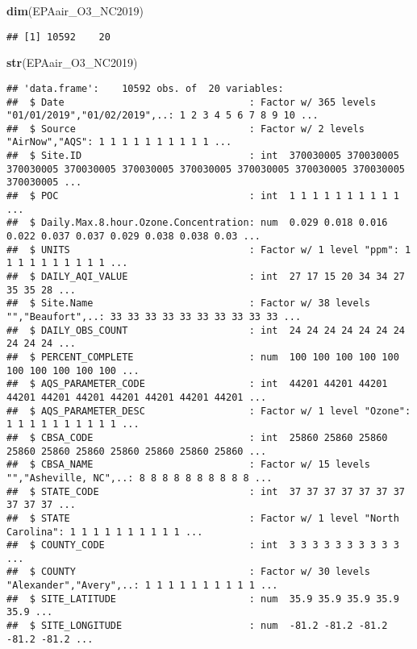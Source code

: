 \documentclass[]{article}
\newenvironment{Shaded}{\begin{snugshade}}{\end{snugshade}}
\newcommand{\KeywordTok}[1]{\textcolor[rgb]{0.13,0.29,0.53}{\textbf{#1}}}
\newcommand{\NormalTok}[1]{#1}
\begin{document}
\begin{Shaded}
\begin{Highlighting}[]
\KeywordTok{dim}\NormalTok{(EPAair_O3_NC2019)}
\end{Highlighting}
\end{Shaded}

\begin{verbatim}
## [1] 10592    20
\end{verbatim}

\begin{Shaded}
\begin{Highlighting}[]
\KeywordTok{str}\NormalTok{(EPAair_O3_NC2019)}
\end{Highlighting}
\end{Shaded}

\begin{verbatim}
## 'data.frame':    10592 obs. of  20 variables:
##  $ Date                                : Factor w/ 365 levels "01/01/2019","01/02/2019",..: 1 2 3 4 5 6 7 8 9 10 ...
##  $ Source                              : Factor w/ 2 levels "AirNow","AQS": 1 1 1 1 1 1 1 1 1 1 ...
##  $ Site.ID                             : int  370030005 370030005 370030005 370030005 370030005 370030005 370030005 370030005 370030005 370030005 ...
##  $ POC                                 : int  1 1 1 1 1 1 1 1 1 1 ...
##  $ Daily.Max.8.hour.Ozone.Concentration: num  0.029 0.018 0.016 0.022 0.037 0.037 0.029 0.038 0.038 0.03 ...
##  $ UNITS                               : Factor w/ 1 level "ppm": 1 1 1 1 1 1 1 1 1 1 ...
##  $ DAILY_AQI_VALUE                     : int  27 17 15 20 34 34 27 35 35 28 ...
##  $ Site.Name                           : Factor w/ 38 levels "","Beaufort",..: 33 33 33 33 33 33 33 33 33 33 ...
##  $ DAILY_OBS_COUNT                     : int  24 24 24 24 24 24 24 24 24 24 ...
##  $ PERCENT_COMPLETE                    : num  100 100 100 100 100 100 100 100 100 100 ...
##  $ AQS_PARAMETER_CODE                  : int  44201 44201 44201 44201 44201 44201 44201 44201 44201 44201 ...
##  $ AQS_PARAMETER_DESC                  : Factor w/ 1 level "Ozone": 1 1 1 1 1 1 1 1 1 1 ...
##  $ CBSA_CODE                           : int  25860 25860 25860 25860 25860 25860 25860 25860 25860 25860 ...
##  $ CBSA_NAME                           : Factor w/ 15 levels "","Asheville, NC",..: 8 8 8 8 8 8 8 8 8 8 ...
##  $ STATE_CODE                          : int  37 37 37 37 37 37 37 37 37 37 ...
##  $ STATE                               : Factor w/ 1 level "North Carolina": 1 1 1 1 1 1 1 1 1 1 ...
##  $ COUNTY_CODE                         : int  3 3 3 3 3 3 3 3 3 3 ...
##  $ COUNTY                              : Factor w/ 30 levels "Alexander","Avery",..: 1 1 1 1 1 1 1 1 1 1 ...
##  $ SITE_LATITUDE                       : num  35.9 35.9 35.9 35.9 35.9 ...
##  $ SITE_LONGITUDE                      : num  -81.2 -81.2 -81.2 -81.2 -81.2 ...
\end{verbatim}
\end{document}

